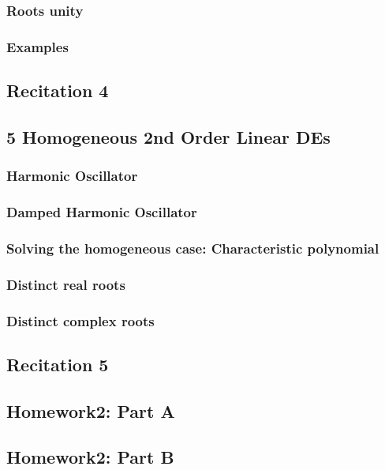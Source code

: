 \documentclass[8pt, a4paper]{article}
\begin{document}
\subsubsection{Roots unity}
\subsubsection{Examples}

\subsection{Recitation 4}

\subsection{5 Homogeneous 2nd Order Linear DEs}
\subsubsection{Harmonic Oscillator}
\subsubsection{Damped Harmonic Oscillator}
\subsubsection{Solving the homogeneous case: Characteristic polynomial}
\subsubsection{Distinct real roots}
\subsubsection{Distinct complex roots}

\subsection{Recitation 5}

\subsection{Homework2: Part A}

\subsection{Homework2: Part B}
\end{document}
